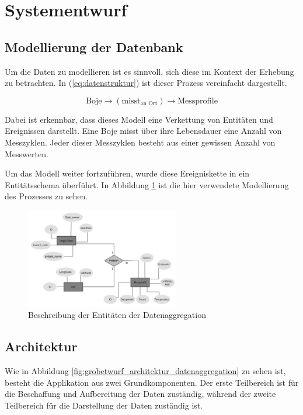 \section{Systementwurf}

\subsection{Modellierung der Datenbank}

Um die Daten zu modellieren ist es sinnvoll, sich diese im Kontext der Erhebung zu betrachten. In (\ref{eq:datenstruktur}) ist dieser Prozess vereinfacht dargestellt.

\begin{equation}
    \mbox{Boje} \to (\mbox{misst}_{\mbox{an Ort}}) \to \mbox{Messprofile}\label{eq:datenstruktur}
\end{equation}

Dabei ist erkennbar, dass dieses Modell eine Verkettung von Entitäten und Ereignissen darstellt. Eine Boje misst über ihre Lebensdauer eine Anzahl von Messzyklen. Jeder dieser Messzyklen besteht aus einer gewissen Anzahl von Messwerten.

Um das Modell weiter fortzuführen, wurde diese Ereigniskette in ein Entitätsschema überführt. In Abbildung \ref{fig:ERM} ist die hier verwendete Modellierung des Prozesses zu sehen.

\begin{figure}[h!]
    \centering
    \includegraphics[width=0.6\textwidth,clip=true,trim=0pt 0pt 0pt 0pt]{pix/erm.png}
    \caption{Beschreibung der Entitäten der Datenaggregation}
    \label{fig:ERM}
\end{figure}


\subsection{Architektur}


Wie in Abbildung \ref{fig:grobetwurf_architektur_datenaggregation} zu sehen ist, besteht die Applikation aus zwei Grundkomponenten. Der erste Teilbereich ist für die Beschaffung und Aufbereitung der Daten zuständig, während der zweite Teilbereich für die Darstellung der Daten zuständig ist.

